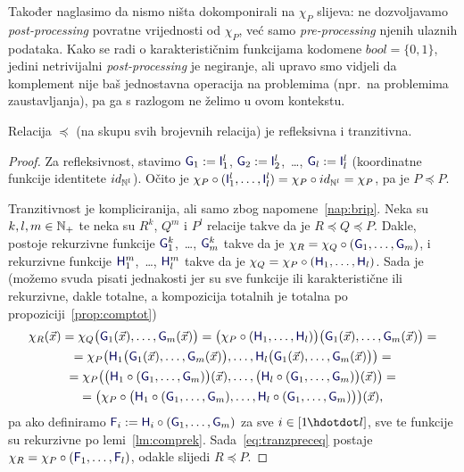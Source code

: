 Također naglasimo da nismo ništa dokomponirali na $\chi_P$ slijeva: ne dozvoljavamo \emph{post-processing} povratne vrijednosti od $\chi_P$, već samo \emph{pre-processing} njenih ulaznih podataka. Kako se radi o karakterističnim funkcijama kodomene $bool=\{0,1\}$, jedini netrivijalni \emph{post-processing} je negiranje, ali upravo smo vidjeli da komplement nije baš jednostavna operacija na problemima (npr.\ na %
problemima zaustavljanja), pa ga s razlogom ne želimo u ovom kontekstu.

\begin{propozicija}[{name=[refleksivnost i tranzitivnost svedivosti]}]\label{pp:preceqrt}
Relacija $\preceq$ (na skupu %
	svih brojevnih relacija) je refleksivna i tranzitivna.
\end{propozicija}
\begin{proof}
	Za refleksivnost, stavimo $\f G_1:=\f I_1^l$, $\f G_2:=\f I_2^l$,~\ldots, $\f G_l:=\f I_l^l$ (koordinatne funkcije identitete $id_{{\mathbb N}^l}$). Očito je $\chi_P\circ(\f I_1^l,\dotsc,\f I_l^l)=\chi_P\circ id_{\N^l}=\chi_P$, pa je $P\preceq P$.

	Tranzitivnost je kompliciranija, ali samo zbog napomene~\ref{nap:brip}. Neka su $k,l,m\in{\mathbb N}_+$ te neka su $R^k$, $Q^m$ i $P^l$ relacije takve da je $R\preceq Q\preceq P$. Dakle, postoje rekurzivne funkcije $\f G_1^k$,~\ldots, $\f G_m^k$ takve da je $\chi_R=\chi_Q\circ(\f G_1,\dotsc,\f G_m)$, i rekurzivne funkcije $\f H_1^m$,~\ldots, $\f H_l^m$ takve da je $\chi_Q=\chi_P\circ(\f H_1,\dotsc,\f H_l)$. Sada je (možemo svuda pisati jednakosti jer su sve funkcije ili karakteristične ili rekurzivne, dakle totalne, a kompozicija totalnih je totalna po propoziciji~\ref{prop:comptot})
\begin{multline}\label{eq:tranzpreceq}
    \chi_R(\vec x)=\chi_Q\bigl(\f G_1(\vec x),\dotsc,\f G_m(\vec x)\bigr)=\bigl(\chi_P\circ(\f H_1,\dotsc,\f H_l)\bigr)\bigl(\f G_1(\vec x),\dotsc,\f G_m(\vec x)\bigr)=\\
    =\chi_P\bigl(
    \f H_1\bigl(\f G_1(\vec x),\dotsc,\f G_m(\vec x)\bigr),\dotsc,
    \f H_l\bigl(\f G_1(\vec x),\dotsc,\f G_m(\vec x)\bigr)
    \bigr)=\\
    =\chi_P\bigl(
    \bigl(\f H_1\circ(\f G_1,\dotsc,\f G_m)\bigr)(\vec x),\dotsc,
    \bigl(\f H_l\circ(\f G_1,\dotsc,\f G_m)\bigr)(\vec x)\bigr)=\\
    =\bigl(\chi_P\circ\bigl(\f H_1\circ(\f G_1,\dotsc,\f G_m),\dotsc,\f H_l\circ(\f G_1,\dotsc,\f G_m)\bigr)\bigr)(\vec x)\text,
\end{multline}
	pa ako definiramo $\f F_i:=\f H_i\circ(\f G_1,\dotsc,\f G_m)$ za sve $i\in[1\mspace{-1mu}\dd l]$, sve te funkcije su rekurzivne po lemi~\ref{lm:comprek}. Sada~\eqref{eq:tranzpreceq} postaje $\chi_R=\chi_P\circ(\f F_1,\dotsc,\f F_l)$, odakle slijedi $R\preceq P$.
\end{proof}

